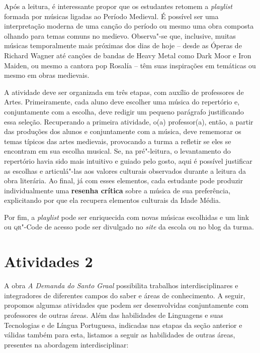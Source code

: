 \documentclass[11pt]{extarticle}
\begin{document}
Após a leitura, é interessante propor que os estudantes
retomem a \emph{playlist} formada por músicas ligadas ao Período
Medieval. É possível ser uma interpretação moderna de uma canção do
período ou mesmo uma obra composta olhando para temas comuns no medievo.
Observa"-se que, inclusive, muitas músicas temporalmente mais próximas
dos dias de hoje -- desde as Óperas de Richard Wagner até canções de
bandas de Heavy Metal como Dark Moor e Iron Maiden, ou mesmo a cantora
pop Rosalía -- têm suas inspirações em temáticas ou mesmo em obras
medievais.

A atividade deve ser organizada em três etapas, com auxílio de
professores de Artes. Primeiramente, cada aluno deve escolher uma música
do repertório e, conjuntamente com a escolha, deve redigir um pequeno
parágrafo justificando essa seleção. Recuperando a primeira atividade,
o(a) professor(a), então, a partir das produções dos alunos e
conjuntamente com a música, deve rememorar os temas típicos das artes
medievais, provocando a turma a refletir se eles se encontram em sua
escolha musical. Se, na pré"-leitura, o levantamento do repertório havia
sido mais intuitivo e guiado pelo gosto, aqui é possível justificar as
escolhas e articulá"-las aos valores culturais observados durante a
leitura da obra literária. Ao final, já com esses elementos, cada
estudante pode produzir individualmente uma \textbf{resenha crítica}
sobre a música de sua preferência, explicitando por que ela recupera
elementos culturais da Idade Média.

Por fim, a \emph{playlist} pode ser enriquecida com novas músicas
escolhidas e um link ou \textsc{qr}"-Code de acesso pode ser divulgado no
\emph{site} da escola ou no blog da turma.


\section{Atividades 2}

A obra \emph{A Demanda do Santo Graal} possibilita trabalhos
interdisciplinares e integradores de diferentes campos do saber e áreas
de conhecimento. A seguir, propomos algumas atividades que podem ser
desenvolvidas conjuntamente com professores de outras áreas. Além das
habilidades de Linguagens e suas Tecnologias e de Língua Portuguesa,
indicadas nas etapas da seção anterior e válidas também para esta,
listamos a seguir as habilidades de outras áreas, presentes na abordagem
interdisciplinar:

\end{document}

